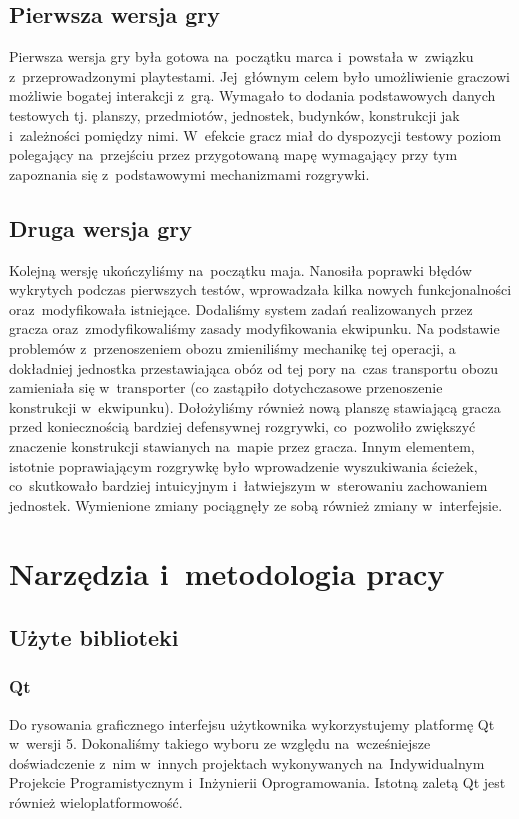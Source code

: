 \documentclass[licencjacka]{pracamgr}
\begin{document}
    \section{Pierwsza wersja gry}
    Pierwsza wersja gry była gotowa na~początku marca i~powstała w~związku z~przeprowadzonymi playtestami. Jej~głównym
    celem było umożliwienie graczowi możliwie bogatej interakcji z~grą. Wymagało to dodania podstawowych
    danych testowych tj. planszy, przedmiotów, jednostek, budynków, konstrukcji jak i~zależności pomiędzy nimi.
    W~efekcie gracz miał do dyspozycji testowy poziom polegający na~przejściu przez przygotowaną mapę wymagający
    przy tym zapoznania się z~podstawowymi mechanizmami rozgrywki.

    \section{Druga wersja gry}
    Kolejną wersję ukończyliśmy na~początku maja. Nanosiła poprawki błędów wykrytych podczas pierwszych testów, wprowadzała kilka nowych
    funkcjonalności oraz~modyfikowała istniejące. Dodaliśmy system zadań realizowanych przez gracza oraz~zmodyfikowaliśmy zasady modyfikowania
    ekwipunku. Na podstawie problemów z~przenoszeniem obozu zmieniliśmy mechanikę tej operacji, a dokładniej jednostka przestawiająca
    obóz od tej pory na~czas transportu obozu zamieniała się w~transporter (co zastąpiło dotychczasowe przenoszenie konstrukcji w~ekwipunku).
    Dołożyliśmy również nową planszę stawiającą gracza przed koniecznością bardziej defensywnej rozgrywki,
    co~pozwoliło zwiększyć znaczenie konstrukcji stawianych na~mapie przez gracza. Innym elementem, istotnie poprawiającym
    rozgrywkę było wprowadzenie wyszukiwania ścieżek, co~skutkowało bardziej intuicyjnym i~łatwiejszym w~sterowaniu
    zachowaniem jednostek. Wymienione zmiany pociągnęły ze sobą również zmiany w~interfejsie.

\chapter{Narzędzia i~metodologia pracy}
  \section{Użyte biblioteki}
    \subsection{Qt}
      Do rysowania graficznego interfejsu użytkownika wykorzystujemy platformę Qt\cite{QT} w~wersji 5. Dokonaliśmy takiego wyboru
      ze względu na~wcześniejsze doświadczenie z~nim w~innych projektach wykonywanych na~Indywidualnym Projekcie Programistycznym
      i~Inżynierii Oprogramowania. Istotną zaletą Qt jest również wieloplatformowość.
\end{document}
